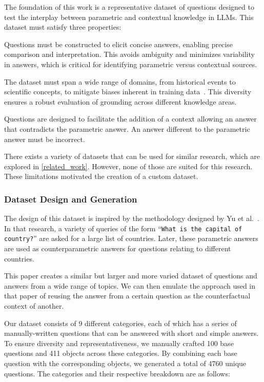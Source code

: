 The foundation of this work is a representative dataset of questions designed to test the interplay between parametric and contextual knowledge in LLMs.
This dataset must satisfy three properties:
\begin{description}[style=nextline]
	\item[1. Short, unambiguous answers] Questions must be constructed to elicit concise answers, enabling precise comparison and interpretation.
This avoids ambiguity and minimizes variability in answers, which is critical for identifying parametric versus contextual sources.
	\item[2. Coverage of diverse topics] The dataset must span a wide range of domains, from historical events to scientific concepts, to mitigate biases inherent in training data~\cite{wikipedia_geographic_bias}.
	This diversity ensures a robust evaluation of grounding across different knowledge areas.
	\item[3. Conterparametric compatibility] Questions are designed to facilitate the addition of a context allowing an answer that contradicts the parametric answer.
		An answer different to the parametric answer must be incorrect.
\end{description}

There exists a variety of datasets that can be used for similar research, which are explored in \cref{related_work}.
However, none of those are suited for this research.
These limitations motivated the creation of a custom dataset.

\subsubsection{Dataset Design and Generation}

The design of this dataset is inspired by the methodology designed by Yu et al.~\cite{factual_recall}.
In that research, a variety of queries of the form ``\texttt{What is the capital of {country}?}'' are asked for a large list of countries.
Later, these parametric answers are used as counterparametric answers for questions relating to different countries.

This paper creates a similar but larger and more varied dataset of questions and answers from a wide range of topics.
We can then emulate the approach used in that paper of reusing the answer from a certain question as the counterfactual context of another.

Our dataset consists of 9 different categories, each of which has a series of manually-written questions that can be answered with short and simple answers.
To ensure diversity and representativeness, we manually crafted 100 base questions and 411 objects across these categories.
By combining each base question with the corresponding objects, we generated a total of 4760 unique questions.
The categories and their respective breakdown are as follows:

